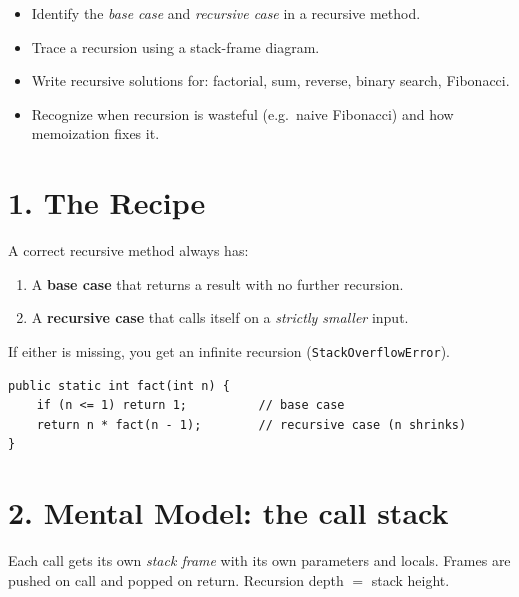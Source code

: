 \documentclass[11pt]{article}
\begin{document}

\begin{objbox}
\begin{itemize}[leftmargin=*]
  \item Identify the \emph{base case} and \emph{recursive case} in a recursive method.
  \item Trace a recursion using a stack-frame diagram.
  \item Write recursive solutions for: factorial, sum, reverse, binary search, Fibonacci.
  \item Recognize when recursion is wasteful (e.g.\ naive Fibonacci) and how memoization fixes it.
\end{itemize}
\end{objbox}

\section*{1. The Recipe}

A correct recursive method always has:
\begin{enumerate}[leftmargin=*]
  \item A \textbf{base case} that returns a result with no further recursion.
  \item A \textbf{recursive case} that calls itself on a \emph{strictly smaller} input.
\end{enumerate}
If either is missing, you get an infinite recursion (\texttt{StackOverflowError}).

\begin{lstlisting}
public static int fact(int n) {
    if (n <= 1) return 1;          // base case
    return n * fact(n - 1);        // recursive case (n shrinks)
}
\end{lstlisting}

\section*{2. Mental Model: the call stack}

Each call gets its own \emph{stack frame} with its own parameters and locals. Frames are pushed on call and popped on return. Recursion depth $=$ stack height.

\begin{center}
\end{center}
\end{document}
